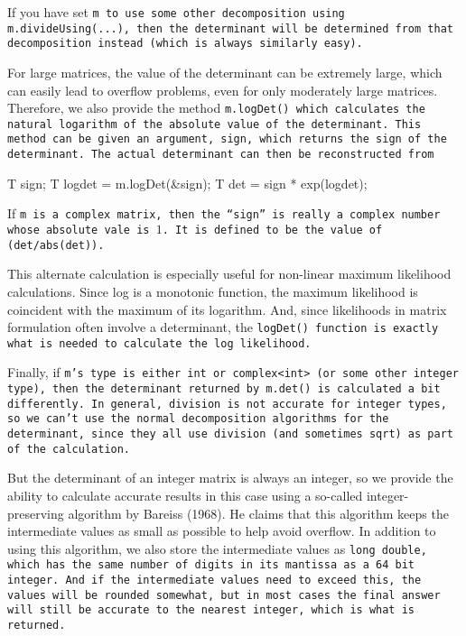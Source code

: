 If you have set \tt{m} to use some other decomposition using 
\tt{m.divideUsing(...)},
then the determinant will be determined from that decomposition instead 
(which is always similarly easy).

For large matrices, the value of the determinant can be extremely large, which can easily
lead to overflow problems, even for only moderately large matrices.  Therefore, we
also provide the method \tt{m.logDet()} which calculates the natural logarithm of the
absolute value of the determinant.  This method can be given an argument, \tt{sign},
which returns the sign of the determinant.  The actual determinant can then be 
reconstructed from 
\begin{tmvcode}
T sign;
T logdet = m.logDet(&sign);
T det = sign * exp(logdet);
\end{tmvcode}
If \tt{m} is a complex matrix, then the ``sign'' is really a complex number whose 
absolute vale is $1$. It is defined to be the value of \tt{(det/abs(det))}.

This alternate calculation is especially useful for non-linear maximum likelihood
calculations.  Since log is a monotonic function, the maximum likelihood is coincident
with the maximum of its logarithm.  And, since likelihoods in matrix formulation
often involve a determinant,
the \tt{logDet()} function is exactly what is needed to calculate the log likelihood.

Finally, if \tt{m}'s type is either \tt{int} or \tt{complex<int>} (or some other integer type),
then the determinant returned by \tt{m.det()} is calculated a bit differently.  In general, division is not accurate
for integer types, so we can't use the normal decomposition algorithms for the determinant,
since they all use division (and sometimes \tt{sqrt}) as part of the calculation.  

But the determinant of an integer matrix
is always an integer, so we provide the ability to calculate accurate results in this case 
using a so-called integer-preserving algorithm by Bareiss (1968).  He claims that this
algorithm keeps the intermediate values as small as possible to help avoid overflow.
In addition to using this algorithm, we also store the intermediate values as \tt{long double},
which has the same number of digits in its mantissa as a 64 bit integer.  And if the intermediate
values need to exceed this, the values will be rounded somewhat, but in most cases the 
final answer will still be accurate to the nearest integer, which is what is returned.

